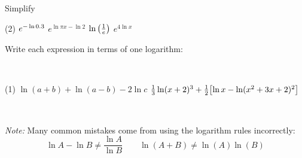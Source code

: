 \documentclass[../mathNotesPreamble]{subfiles}
\begin{document}
  \begin{ex*}
    Simplify
  \end{ex*}
  \begin{extasks}[after-item-skip=\stretch{1}](2)
    \task $e\inv[\ln 0.3]$
    \task $e^{\ln \pi x-\ln 2}$
    \task $\ln\parens{\frac{1}{e}}$
    \task $e^{4\ln x}$
  \end{extasks}

  \pagebreak
  \begin{ex*}
    Write each expression in terms of one logarithm:
    
    \noindent
    \begin{minipage}[t]{0.55\linewidth}~
      \begin{extasks}[after-item-skip=2.25in](1)
        \task $\ln(a+b)+\ln(a-b)-2\ln c$
        \task $\frac{1}{3}\ln(x+2)^3 +\frac{1}{2}\sbrkt{\ln x-\ln(x^2+3x+2)^2}$
      \end{extasks}
    \end{minipage}%
    \begin{minipage}[t]{0.45\linewidth}~
      \begin{flushright}
      \end{flushright}
    \end{minipage}
  \end{ex*}

  \begin{thmBox*}
    \textit{Note:} Many common mistakes come from using the logarithm rules incorrectly:
      $$\ln A-\ln B\neq \dfrac{\ln A}{\ln B}\qquad \ln(A+B)\neq\ln(A)\ln(B)$$
  \end{thmBox*}
  \pagebreak
\end{document}
